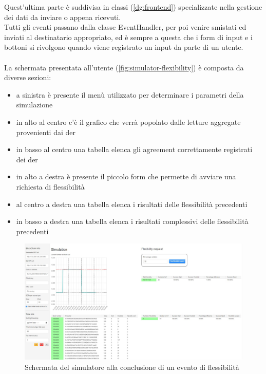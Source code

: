 Quest'ultima parte è suddivisa in classi (\autoref{dg:frontend}) specializzate nella gestione dei dati da inviare o appena ricevuti. \\
Tutti gli eventi passano dalla classe EventHandler, per poi venire smistati ed inviati al destinatario appropriato,
ed è sempre a questa che i form di input e i bottoni si rivolgono quando viene registrato un input da parte di un utente. \\
\\
La schermata presentata all'utente (\autoref{fig:simulator-flexibility}) è composta da diverse sezioni:
\begin{itemize}
    \item a sinistra è presente il menù utilizzato per determinare i parametri della simulazione
    \item in alto al centro c'è il grafico che verrà popolato dalle letture aggregate provenienti dai \gls{der}
    \item in basso al centro una tabella elenca gli \gls{agreement} correttamente registrati dei \gls{der}
    \item in alto a destra è presente il piccolo form che permette di avviare una richiesta di flessibilità
    \item al centro a destra una tabella elenca i risultati delle flessibilità precedenti
    \item in basso a destra una tabella elenca i risultati complessivi delle flessibilità precedenti
\end{itemize}



\begin{figure}[h]
    \includegraphics[width=\textwidth]{img/SimulatorFlexibility.jpg}
    \caption{Schermata del simulatore alla conclusione di un evento di flessibilità \label{fig:simulator-flexibility}}
\end{figure}